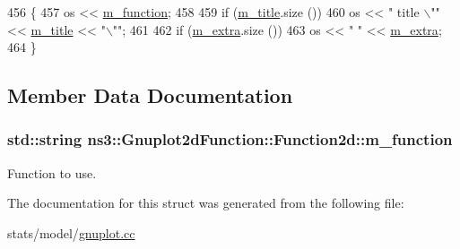 \begin{DoxyCode}
456 \{
457   os << \hyperlink{structns3_1_1Gnuplot2dFunction_1_1Function2d_a819a4f4f871e8736c9da8dbfde0ca24e}{m\_function};
458 
459   \textcolor{keywordflow}{if} (\hyperlink{structns3_1_1GnuplotDataset_1_1Data_ab8c0e78c05f666aaf901794a1e2b06ab}{m\_title}.size ())
460     os << \textcolor{stringliteral}{" title \(\backslash\)""} << \hyperlink{structns3_1_1GnuplotDataset_1_1Data_ab8c0e78c05f666aaf901794a1e2b06ab}{m\_title} << \textcolor{stringliteral}{"\(\backslash\)""};
461 
462   \textcolor{keywordflow}{if} (\hyperlink{structns3_1_1GnuplotDataset_1_1Data_a25343752a00d9ed36df0d3996e177277}{m\_extra}.size ())
463     os << \textcolor{stringliteral}{" "} << \hyperlink{structns3_1_1GnuplotDataset_1_1Data_a25343752a00d9ed36df0d3996e177277}{m\_extra};
464 \}
\end{DoxyCode}


\subsection{Member Data Documentation}
\subsubsection[{\texorpdfstring{m\+\_\+function}{m_function}}]{\setlength{\rightskip}{0pt plus 5cm}std\+::string ns3\+::\+Gnuplot2d\+Function\+::\+Function2d\+::m\+\_\+function}\hypertarget{structns3_1_1Gnuplot2dFunction_1_1Function2d_a819a4f4f871e8736c9da8dbfde0ca24e}{}\label{structns3_1_1Gnuplot2dFunction_1_1Function2d_a819a4f4f871e8736c9da8dbfde0ca24e}


Function to use. 



The documentation for this struct was generated from the following file\+:\begin{DoxyCompactItemize}
\item 
stats/model/\hyperlink{gnuplot_8cc}{gnuplot.\+cc}\end{DoxyCompactItemize}
